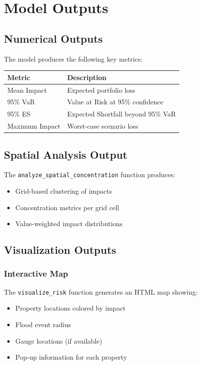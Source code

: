 \documentclass{article}
\begin{document}
\section{Model Outputs}

\subsection{Numerical Outputs}
The model produces the following key metrics:

\begin{table}[h]
\begin{tabular}{ll}
\hline
\textbf{Metric} & \textbf{Description} \\
\hline
Mean Impact & Expected portfolio loss \\
95\% VaR & Value at Risk at 95\% confidence \\
95\% ES & Expected Shortfall beyond 95\% VaR \\
Maximum Impact & Worst-case scenario loss \\
\hline
\end{tabular}
\end{table}

\subsection{Spatial Analysis Output}
The \texttt{analyze\_spatial\_concentration} function produces:
\begin{itemize}
    \item Grid-based clustering of impacts
    \item Concentration metrics per grid cell
    \item Value-weighted impact distributions
\end{itemize}

\subsection{Visualization Outputs}

\subsubsection{Interactive Map}
The \texttt{visualize\_risk} function generates an HTML map showing:
\begin{itemize}
    \item Property locations colored by impact
    \item Flood event radius
    \item Gauge locations (if available)
    \item Pop-up information for each property
\end{itemize}
\end{document}
